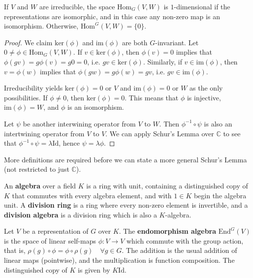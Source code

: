 \begin{cor}
If $V$ and $W$ are irreducible, the space $\text{Hom}_G(V,W)$ is $1$-dimensional if the representations are isomorphic, and in this case any non-zero map is an isomorphism. Otherwise,  $\text{Hom}^G(V,W)=\{0\}$.
\end{cor}
\begin{proof}
We claim $\text{ker}(\phi)$ and $\text{im}(\phi)$ are both $G$-invariant. Let $0 \neq \phi \in \text{Hom}_G(V,W)$.  If $v \in \text{ker}(\phi)$, then $\phi(v) = 0$ implies that  $\phi (gv) = g  \phi(v) = g  0 =0$, i.e. $ gv \in \text{ker}(\phi)$. Similarly, if $v \in \text{im}(\phi)$, then $v = \phi(w)$ implies that $\phi (gw) = g \phi(w) = gv$, i.e. $gv \in \text{im}(\phi)$.    

Irreducibility yields $\text{ker}(\phi) = 0 $ or $V$ and $\text{im}(\phi) = 0$ or  $W$ as the only possibilities.  If $\phi \neq 0$, then $\text{ker}(\phi) = 0$.  This means that $\phi$ is injective,  $\text{im}(\phi) = W$, and $\phi$ is an isomorphism. 

Let $\psi$ be another interwining operator from $V$ to $W$.  Then $\phi ^{-1} \circ \psi$ is also an intertwining operator from $V$ to $V$.  We can apply Schur's Lemma over $\mathbb{C}$ to see that $\phi ^{-1} \circ \psi = \lambda \text{Id}$, hence $\psi = \lambda \phi$.
\end{proof}

More definitions are required before we can state a more general Schur's Lemma (not restricted to just $\mathbb{C}$).

\begin{defn}
An \textbf{algebra} over a field $K$ is a ring with unit, containing a distinguished copy of $K$ that commutes with every algebra element, and with $1 \in K$ begin the algebra unit.  A \textbf{division ring} is a ring where every non-zero element is invertible, and a \textbf{division algebra} is a division ring which is also a $K$-algebra.
\end{defn}

\begin{defn}
Let $V$ be a representation of $G$ over $K$.  The \textbf{endomorphism algebra} $\text{End}^G(V)$ is the space of linear self-maps $\phi \colon V \to V$ which commute with the group action, that is, $\rho(g) \circ \phi = \phi \circ \rho(g) \quad \forall g \in G$.  The addition is the usual addition of linear maps (pointwise), and the multiplication is function composition.  The distinguished copy of $K$ is given by $K \text{Id}$.
\end{defn}

